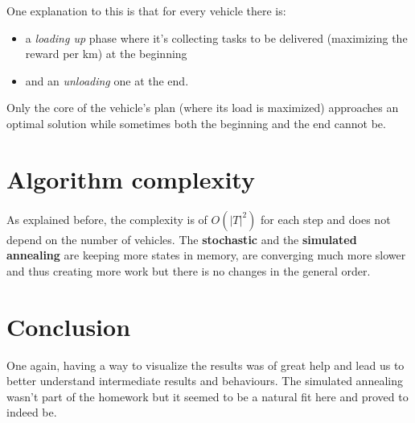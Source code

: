 \documentclass[11pt,a4paper]{article}
\begin{document}
One explanation to this is that for every vehicle there is:
\begin{itemize}
    \item a \emph{loading up} phase where it's collecting tasks to be delivered
        (maximizing the reward per km) at the beginning

    \item and an \emph{unloading} one at the end.

\end{itemize}

Only the core of the vehicle's plan (where its load is maximized) approaches an
optimal solution while sometimes both the beginning and the end cannot be.


\section*{Algorithm complexity}

As explained before, the complexity is of $O(|T|^2)$ for each step and does not
depend on the number of vehicles. The \textbf{stochastic} and the \textbf{simulated annealing}
are keeping more states in memory, are converging much more slower and thus
creating more work but there is no changes in the general order.


\section*{Conclusion}

One again, having a way to visualize the results was of great help and lead us
to better understand intermediate results and behaviours. The simulated
annealing wasn't part of the homework but it seemed to be a natural fit here
and proved to indeed be.
\end{document}
